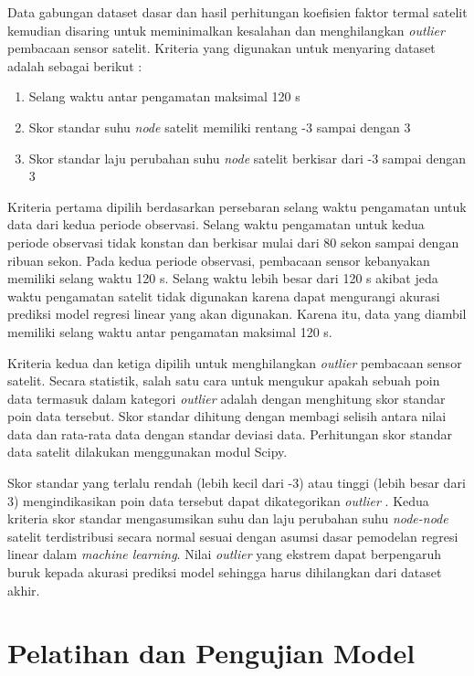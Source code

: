Data gabungan dataset dasar dan hasil perhitungan koefisien faktor termal
satelit kemudian disaring untuk meminimalkan kesalahan dan menghilangkan
\textit{outlier} pembacaan sensor satelit. Kriteria yang digunakan untuk
menyaring dataset adalah sebagai berikut :

\begin{enumerate}
\item Selang waktu antar pengamatan maksimal 120 s 
\item Skor standar suhu \textit{node} satelit memiliki rentang -3 sampai dengan 3
\item Skor standar laju perubahan suhu \textit{node} satelit berkisar dari -3 sampai dengan 3 
\end{enumerate}

Kriteria pertama dipilih berdasarkan persebaran selang waktu pengamatan untuk
data dari kedua periode observasi. Selang waktu pengamatan untuk kedua periode
observasi tidak konstan dan berkisar mulai dari 80 sekon sampai dengan ribuan
sekon. Pada kedua periode observasi, pembacaan sensor kebanyakan memiliki
selang waktu 120 s. Selang waktu lebih besar dari 120 s akibat jeda waktu
pengamatan satelit tidak digunakan karena dapat mengurangi akurasi prediksi
model regresi linear yang akan digunakan. Karena itu, data yang diambil
memiliki selang waktu antar pengamatan maksimal 120 s.

Kriteria kedua dan ketiga dipilih untuk menghilangkan \textit{outlier}
pembacaan sensor satelit. Secara statistik, salah satu cara untuk mengukur
apakah sebuah poin data termasuk dalam kategori \textit{outlier} adalah dengan
menghitung skor standar poin data tersebut. Skor standar dihitung dengan
membagi selisih antara nilai data dan rata-rata data dengan standar deviasi
data. Perhitungan skor standar data satelit dilakukan menggunakan modul Scipy.

Skor standar yang terlalu rendah (lebih kecil dari -3) atau tinggi (lebih besar
dari 3) mengindikasikan poin data tersebut dapat dikategorikan \textit{outlier}
\cite{boschetti2015}. Kedua kriteria skor standar mengasumsikan suhu dan laju
perubahan suhu \textit{node-node} satelit terdistribusi secara normal sesuai
dengan asumsi dasar pemodelan regresi linear dalam \textit{machine learning}.
Nilai \textit{outlier} yang ekstrem dapat berpengaruh buruk kepada akurasi
prediksi model sehingga harus dihilangkan dari dataset akhir.

\section{Pelatihan dan Pengujian Model}

